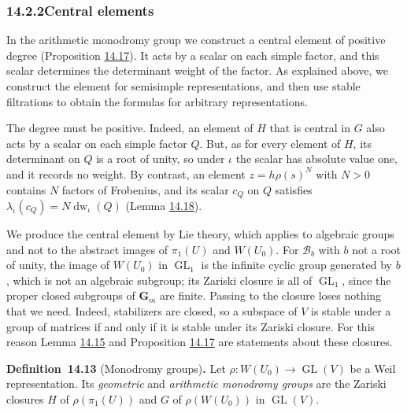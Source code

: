 \documentclass[11pt]{article}
\newenvironment{bpstatement}[2]{\par\addvspace{0.6\baselineskip}\noindent\textbf{#1}#2\textbf{.}\enspace\ignorespaces}
  {\par\addvspace{0.4\baselineskip}}
\providecommand{\GL}{}\renewcommand{\GL}{\operatorname{GL}}
\begin{document}
\subsubsection*{\texorpdfstring{14.2.2\quad Central elements}{14.2.2 Central elements}}
\label{bp42}%
\label{bp43}%
In the arithmetic monodromy group we construct a central element of positive degree (Proposition \hyperref[bp54]{14.17}). It acts by a scalar on each simple factor, and this scalar determines the determinant weight of the factor. As explained above, we construct the element for semisimple representations, and then use stable filtrations to obtain the formulas for arbitrary representations.

The degree must be positive. Indeed, an element of \(H\) that is central in \(G\) also acts by a scalar on each simple factor \(Q\). But, as for every element of \(H\), its determinant on \(Q\) is a root of unity, so under \(\iota\) the scalar has absolute value one, and it records no weight. By contrast, an element \(z=h\rho(s)^N\) with \(N>0\) contains \(N\) factors of Frobenius, and its scalar \(c_Q\) on \(Q\) satisfies \(\lambda_\iota(c_Q)=N\operatorname{dw}_\iota(Q)\) (Lemma \hyperref[bp58]{14.18}).

We produce the central element by Lie theory, which applies to algebraic groups and not to the abstract images of \(\pi_1(U)\) and \(W(U_0)\). For \(\mathcal B_b\) with \(b\) not a root of unity, the image of \(W(U_0)\) in \(\GL_1\) is the infinite cyclic group generated by \(b\), which is not an algebraic subgroup; its Zariski closure is all of \(\GL_1\), since the proper closed subgroups of \(\mathbf G_m\) are finite. Passing to the closure loses nothing that we need. Indeed, stabilizers are closed, so a subspace of \(V\) is stable under a group of matrices if and only if it is stable under its Zariski closure. For this reason Lemma \hyperref[bp49]{14.15} and Proposition \hyperref[bp54]{14.17} are statements about these closures.

\label{bp44}%
\begin{bpstatement}{Definition~14.13}{ (Monodromy groups)}
Let \(\rho:W(U_0)\to\GL(V)\) be a Weil representation. Its \emph{geometric} and \emph{arithmetic monodromy groups} are the Zariski closures \(H\) of \(\rho(\pi_1(U))\) and \(G\) of \(\rho(W(U_0))\) in \(\GL(V)\).
\end{bpstatement}
\end{document}
